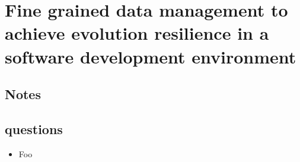 \chapter{Fine grained data management to achieve evolution resilience in a software development environment \cite{snodgrass1990fine}}
\section{Notes}

\section{questions}
\begin{itemize}
  \item Foo
\end{itemize}

